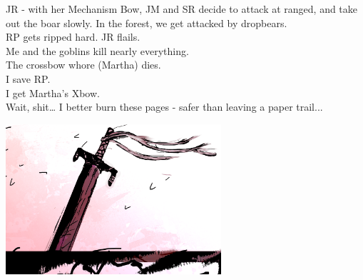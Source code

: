 JR - with her Mechanism Bow, JM and SR decide to attack at ranged, and take out the boar slowly.
In the forest, we get attacked by dropbears.\\
RP gets ripped hard. JR flails.\\
Me and the goblins kill nearly everything.\\
The crossbow whore (Martha) dies.\\
I save RP.\\
I get Martha’s Xbow.\\
Wait, shit… I better burn these pages - safer than leaving a paper trail... \\
\begin{center}
\includegraphics[width=80mm]{./content/img/otoriagrave.png}
\begin{figure}[h]
\end{figure}
\end{center}

\clearpage